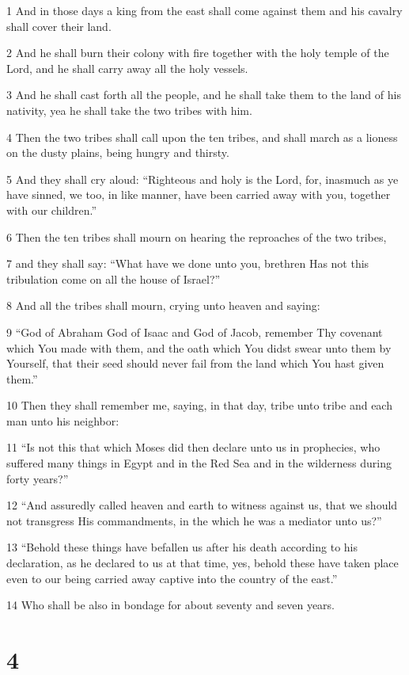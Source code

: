 \par 1 And in those days a king from the east shall come against them and his cavalry shall cover their land.
\par 2 And he shall burn their colony with fire together with the holy temple of the Lord, and he shall carry away all the holy vessels.
\par 3 And he shall cast forth all the people, and he shall take them to the land of his nativity, yea he shall take the two tribes with him.
\par 4 Then the two tribes shall call upon the ten tribes, and shall march as a lioness on the dusty plains, being hungry and thirsty.
\par 5 And they shall cry aloud: “Righteous and holy is the Lord, for, inasmuch as ye have sinned, we too, in like manner, have been carried away with you, together with our children.”
\par 6 Then the ten tribes shall mourn on hearing the reproaches of the two tribes,
\par 7 and they shall say: “What have we done unto you, brethren Has not this tribulation come on all the house of Israel?”
\par 8 And all the tribes shall mourn, crying unto heaven and saying:
\par 9 “God of Abraham God of Isaac and God of Jacob, remember Thy covenant which You made with them, and the oath which You didst swear unto them by Yourself, that their seed should never fail from the land which You hast given them.”
\par 10 Then they shall remember me, saying, in that day, tribe unto tribe and each man unto his neighbor:
\par 11 “Is not this that which Moses did then declare unto us in prophecies, who suffered many things in Egypt and in the Red Sea and in the wilderness during forty years?”
\par 12 “And assuredly called heaven and earth to witness against us, that we should not transgress His commandments, in the which he was a mediator unto us?”
\par 13 “Behold these things have befallen us after his death according to his declaration, as he declared to us at that time, yes, behold these have taken place even to our being carried away captive into the country of the east.”
\par 14 Who shall be also in bondage for about seventy and seven years.

\chapter{4}

